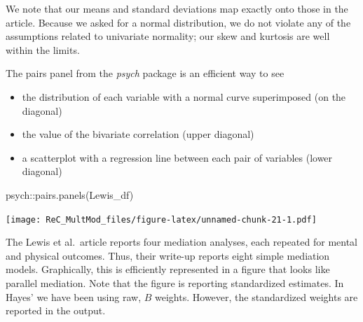 \documentclass[
  11pt,
]{book}
\newenvironment{Shaded}{\begin{snugshade}}{\end{snugshade}}
\newcommand{\FunctionTok}[1]{\textcolor[rgb]{0.00,0.00,0.00}{#1}}
\newcommand{\NormalTok}[1]{#1}
\newcommand{\SpecialCharTok}[1]{\textcolor[rgb]{0.00,0.00,0.00}{#1}}
\providecommand{\tightlist}{%
  \setlength{\itemsep}{0pt}\setlength{\parskip}{0pt}}
\begin{document}
We note that our means and standard deviations map exactly onto those in the article. Because we asked for a normal distribution, we do not violate any of the assumptions related to univariate normality; our skew and kurtosis are well within the limits.

The pairs panel from the \emph{psych} package is an efficient way to see

\begin{itemize}
\tightlist
\item
  the distribution of each variable with a normal curve superimposed (on the diagonal)
\item
  the value of the bivariate correlation (upper diagonal)
\item
  a scatterplot with a regression line between each pair of variables (lower diagonal)
\end{itemize}

\begin{Shaded}
\begin{Highlighting}[]
\NormalTok{psych}\SpecialCharTok{::}\FunctionTok{pairs.panels}\NormalTok{(Lewis\_df)}
\end{Highlighting}
\end{Shaded}

\texttt{[image: ReC\_MultMod\_files/figure-latex/unnamed-chunk-21-1.pdf]}

The Lewis et al.~article \citeyearpar{lewis_applying_2017} reports four mediation analyses, each repeated for mental and physical outcomes. Thus, their write-up reports eight simple mediation models. Graphically, this is efficiently represented in a figure that looks like parallel mediation. Note that the figure is reporting standardized estimates. In Hayes' \citeyearpar{hayes_introduction_2018} we have been using raw, \(B\) weights. However, the standardized weights are reported in the output.
\end{document}
